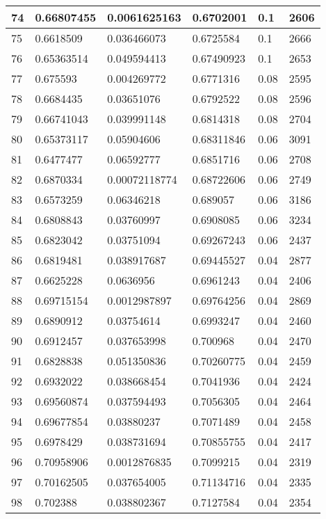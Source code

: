 \begin{longtable}{|l|l|l|l|l|l|}
74 & 0.66807455 & 0.0061625163 & 0.6702001 & 0.1 & 2606 \\ \hline 
75 & 0.6618509 & 0.036466073 & 0.6725584 & 0.1 & 2666 \\ \hline 
76 & 0.65363514 & 0.049594413 & 0.67490923 & 0.1 & 2653 \\ \hline 
77 & 0.675593 & 0.004269772 & 0.6771316 & 0.08 & 2595 \\ \hline 
78 & 0.6684435 & 0.03651076 & 0.6792522 & 0.08 & 2596 \\ \hline 
79 & 0.66741043 & 0.039991148 & 0.6814318 & 0.08 & 2704 \\ \hline 
80 & 0.65373117 & 0.05904606 & 0.68311846 & 0.06 & 3091 \\ \hline 
81 & 0.6477477 & 0.06592777 & 0.6851716 & 0.06 & 2708 \\ \hline 
82 & 0.6870334 & 0.00072118774 & 0.68722606 & 0.06 & 2749 \\ \hline 
83 & 0.6573259 & 0.06346218 & 0.689057 & 0.06 & 3186 \\ \hline 
84 & 0.6808843 & 0.03760997 & 0.6908085 & 0.06 & 3234 \\ \hline 
85 & 0.6823042 & 0.03751094 & 0.69267243 & 0.06 & 2437 \\ \hline 
86 & 0.6819481 & 0.038917687 & 0.69445527 & 0.04 & 2877 \\ \hline 
87 & 0.6625228 & 0.0636956 & 0.6961243 & 0.04 & 2406 \\ \hline 
88 & 0.69715154 & 0.0012987897 & 0.69764256 & 0.04 & 2869 \\ \hline 
89 & 0.6890912 & 0.03754614 & 0.6993247 & 0.04 & 2460 \\ \hline 
90 & 0.6912457 & 0.037653998 & 0.700968 & 0.04 & 2470 \\ \hline 
91 & 0.6828838 & 0.051350836 & 0.70260775 & 0.04 & 2459 \\ \hline 
92 & 0.6932022 & 0.038668454 & 0.7041936 & 0.04 & 2424 \\ \hline 
93 & 0.69560874 & 0.037594493 & 0.7056305 & 0.04 & 2464 \\ \hline 
94 & 0.69677854 & 0.03880237 & 0.7071489 & 0.04 & 2458 \\ \hline 
95 & 0.6978429 & 0.038731694 & 0.70855755 & 0.04 & 2417 \\ \hline 
96 & 0.70958906 & 0.0012876835 & 0.7099215 & 0.04 & 2319 \\ \hline 
97 & 0.70162505 & 0.037654005 & 0.71134716 & 0.04 & 2335 \\ \hline 
98 & 0.702388 & 0.038802367 & 0.7127584 & 0.04 & 2354 \\ \hline 

\end{longtable}
